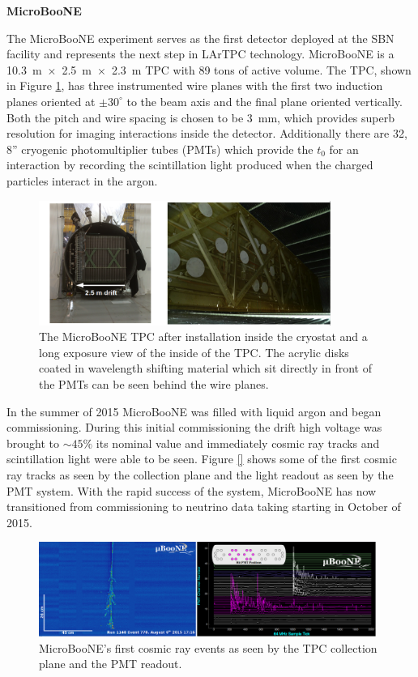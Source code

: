 
\begin{center}
\Large\textbf{MicroBooNE}
\end{center}

The MicroBooNE experiment serves as the first detector deployed at the SBN facility and represents the next step in LArTPC technology. MicroBooNE is a 10.3~m~$\times$~2.5~m~$\times$~2.3~m TPC with 89 tons of active volume. The TPC, shown in Figure \ref{fig:uboone}, has three instrumented wire planes with the first two induction planes oriented at $\pm 30^{\circ}$ to the beam axis and the final plane oriented vertically. Both the pitch and wire spacing is chosen to be 3~mm, which provides superb resolution for imaging interactions inside the detector. Additionally there are 32, 8'' cryogenic photomultiplier tubes (PMTs) which provide the $t_{0}$ for an interaction by recording the scintillation light produced when the charged particles interact in the argon.

\begin{figure}[htb]
\centering
\includegraphics[width=0.85\textwidth]{images/microboone.png}
\caption[]{The MicroBooNE TPC after installation inside the cryostat and a long exposure view of the inside of the TPC. The acrylic disks coated in wavelength shifting material which sit directly in front of the PMTs can be seen behind the wire planes.}
\label{fig:uboone}
\end{figure}

In the summer of 2015 MicroBooNE was filled with liquid argon and began commissioning. During this initial commissioning the drift high voltage was brought to $\sim 45\%$ its nominal value and immediately cosmic ray tracks and scintillation light were able to be seen. Figure \ref{} shows some of the first cosmic ray tracks as seen by the collection plane and the light readout as seen by the PMT system. With the rapid success of the system, MicroBooNE has now transitioned from commissioning to neutrino data taking starting in October of 2015. 

\begin{figure}[htb]
\centering
\includegraphics[width=0.98\textwidth]{images/microbooneEvents.png}
\caption[]{MicroBooNE's first cosmic ray events as seen by the TPC collection plane and the PMT readout.}
\label{fig:ubooneEvents}
\end{figure}

